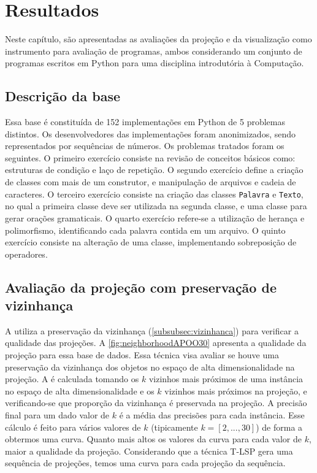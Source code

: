 \chapter{Resultados}
\label{chap:resultados}

	Neste capítulo, são apresentadas as avaliações da projeção e da visualização como
	instrumento para avaliação de programas, ambos considerando um conjunto de
	programas escritos em Python para uma disciplina introdutória à Computação.
	
	
	\section{Descrição da base}
	\label{sec:resultados:base-apoo}

		Essa base é constituída de 152 implementações em Python de 5 problemas distintos.
		Os desenvolvedores das implementações foram anonimizados, sendo representados por 
		sequências de números. Os problemas tratados foram os seguintes. O primeiro exercício
		consiste na revisão de conceitos básicos como: estruturas de condição e laço de repetição. O
		segundo exercício define a criação de classes com mais de um construtor, e manipulação de
		arquivos e cadeia de caracteres. O terceiro exercício consiste na criação das classes
		\texttt{Palavra} e \texttt{Texto}, no qual a primeira classe deve ser utilizada na segunda
		classe, e uma classe para gerar orações gramaticais. O quarto exercício refere-se a
		utilização de herança e polimorfismo, identificando cada palavra contida em um arquivo. O
		quinto exercício consiste na alteração de uma classe, implementando sobreposição de
		operadores. 
		
	
	\section{Avaliação da projeção com preservação de vizinhança}

	A  utiliza a preservação da vizinhança
	(\cref{subsubsec:vizinhanca}) para verificar a qualidade das projeções. A \cref{fig:neighborhoodAPOO30}
	apresenta a qualidade da projeção para essa base de dados. Essa técnica visa avaliar
	se houve uma preservação da vizinhança dos objetos no espaço de alta dimensionalidade
	na projeção. A  é calculada tomando os $k$ vizinhos
	mais próximos de uma instância no espaço de alta dimensionalidade e os $k$ vizinhos
	mais próximos na projeção, e verificando-se que proporção da vizinhança é preservada
	na projeção. A precisão final para um dado valor de $k$ é a média das precisões para
	cada instância. Esse cálculo é feito para vários valores de $k$ (tipicamente $k=[2,...,30]$)
	de forma a obtermos uma curva. Quanto mais altos os valores da curva para cada valor
	de $k$, maior a qualidade da projeção. Considerando que a técnica \acl{T-LSP} \cite{Alencar}
	gera uma sequência de projeções, temos uma curva para cada projeção da
	sequência.
	

